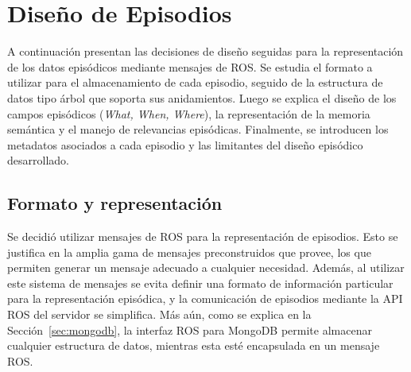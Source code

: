 \section{Diseño de Episodios}\label{sec:ep_design}

A continuación presentan las decisiones de diseño seguidas para la representación de los datos episódicos mediante mensajes de ROS. Se estudia el formato a utilizar para el almacenamiento de cada episodio, seguido de la estructura de datos tipo árbol que soporta sus anidamientos. Luego se explica el diseño de los campos episódicos (\textit{What, When, Where}), la representación de la memoria semántica y el manejo de relevancias episódicas. Finalmente, se introducen los metadatos asociados a cada episodio y las limitantes del diseño episódico desarrollado.


\subsection{Formato y representación}

Se decidió utilizar mensajes de ROS para la representación de episodios. Esto se justifica en la amplia gama de mensajes preconstruidos que provee, los que permiten generar un mensaje adecuado a cualquier necesidad. Además, al utilizar este sistema de mensajes se evita definir una formato de información particular para la representación episódica, y la comunicación de episodios mediante la API ROS del servidor se simplifica. Más aún, como se explica en la Sección~\ref{sec:mongodb}, la interfaz ROS para MongoDB permite almacenar cualquier estructura de datos, mientras esta esté encapsulada en un mensaje ROS.

